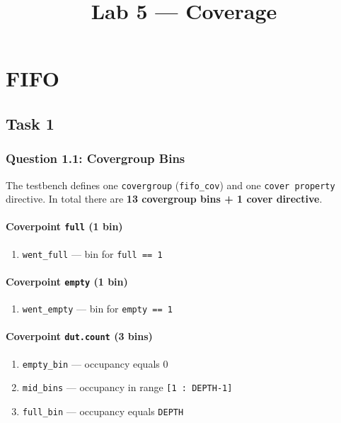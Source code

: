 \documentclass[11pt]{article}
\title{\textbf{Lab 5 --- Coverage}}
\author{}
\date{}
\begin{document}
\maketitle

\section*{FIFO}

\subsection*{Task 1}

\subsubsection*{Question 1.1: Covergroup Bins}

The testbench defines one \texttt{covergroup} (\texttt{fifo\_cov}) and one \texttt{cover property} directive. In total there are \textbf{13 covergroup bins + 1 cover directive}.

\paragraph*{Coverpoint \texttt{full} (1 bin)}
\begin{enumerate}[label=\arabic*.]
  \item \texttt{went\_full} --- bin for \texttt{full == 1}
\end{enumerate}

\paragraph*{Coverpoint \texttt{empty} (1 bin)}
\begin{enumerate}[resume, label=\arabic*.]
  \item \texttt{went\_empty} --- bin for \texttt{empty == 1}
\end{enumerate}

\paragraph*{Coverpoint \texttt{dut.count} (3 bins)}
\begin{enumerate}[resume, label=\arabic*.]
  \item \texttt{empty\_bin} --- occupancy equals 0
  \item \texttt{mid\_bins} --- occupancy in range \texttt{[1 : DEPTH-1]}
  \item \texttt{full\_bin} --- occupancy equals \texttt{DEPTH}
\end{enumerate}
\end{document}
